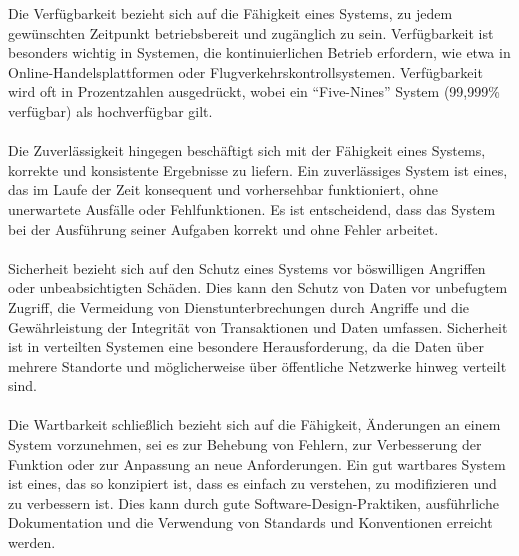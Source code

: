 Die Verfügbarkeit bezieht sich auf die Fähigkeit eines Systems, zu jedem gewünschten Zeitpunkt betriebsbereit und zugänglich zu sein. Verfügbarkeit ist besonders wichtig in Systemen, die kontinuierlichen Betrieb erfordern, wie etwa in Online-Handelsplattformen oder Flugverkehrskontrollsystemen. Verfügbarkeit wird oft in Prozentzahlen ausgedrückt, wobei ein \enquote{Five-Nines} System (99,999\% verfügbar) als hochverfügbar gilt.
\\\\
Die Zuverlässigkeit hingegen beschäftigt sich mit der Fähigkeit eines Systems, korrekte und konsistente Ergebnisse zu liefern. Ein zuverlässiges System ist eines, das im Laufe der Zeit konsequent und vorhersehbar funktioniert, ohne unerwartete Ausfälle oder Fehlfunktionen. Es ist entscheidend, dass das System bei der Ausführung seiner Aufgaben korrekt und ohne Fehler arbeitet.
\\\\
Sicherheit bezieht sich auf den Schutz eines Systems vor böswilligen Angriffen oder unbeabsichtigten Schäden. Dies kann den Schutz von Daten vor unbefugtem Zugriff, die Vermeidung von Dienstunterbrechungen durch Angriffe und die Gewährleistung der Integrität von Transaktionen und Daten umfassen. Sicherheit ist in verteilten Systemen eine besondere Herausforderung, da die Daten über mehrere Standorte und möglicherweise über öffentliche Netzwerke hinweg verteilt sind.
\\\\
Die Wartbarkeit schließlich bezieht sich auf die Fähigkeit, Änderungen an einem System vorzunehmen, sei es zur Behebung von Fehlern, zur Verbesserung der Funktion oder zur Anpassung an neue Anforderungen. Ein gut wartbares System ist eines, das so konzipiert ist, dass es einfach zu verstehen, zu modifizieren und zu verbessern ist. Dies kann durch gute Software-Design-Praktiken, ausführliche Dokumentation und die Verwendung von Standards und Konventionen erreicht werden.
